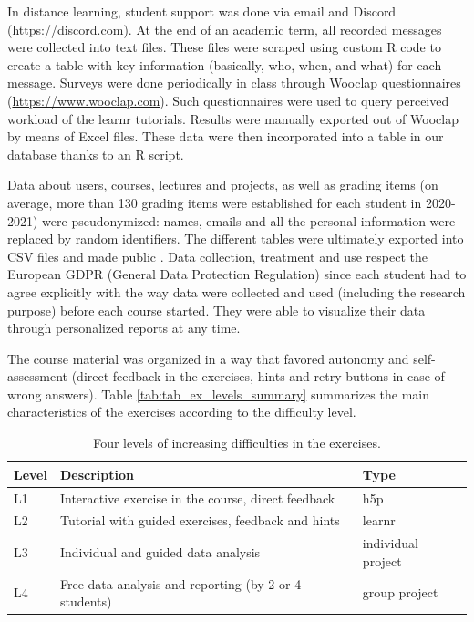 \documentclass{aims} %
\theoremstyle{definition}
\begin{document}
In distance learning, student support was done via email and Discord
(\url{https://discord.com}). At the end of an academic term, all
recorded messages were collected into text files. These files were
scraped using custom R code to create a table with key information
(basically, who, when, and what) for each message. Surveys were done
periodically in class through Wooclap questionnaires
(\url{https://www.wooclap.com}). Such questionnaires were used to query
perceived workload of the learnr tutorials. Results were manually
exported out of Wooclap by means of Excel files. These data were then
incorporated into a table in our database thanks to an R script.

Data about users, courses, lectures and projects, as well as grading
items (on average, more than 130 grading items were established for each
student in 2020-2021) were pseudonymized: names, emails and all the
personal information were replaced by random identifiers. The different
tables were ultimately exported into CSV files and made public
\cite{Grosjeandataset2020}. Data collection, treatment and use respect
the European GDPR (General Data Protection Regulation) since each
student had to agree explicitly with the way data were collected and
used (including the research purpose) before each course started. They
were able to visualize their data through personalized reports at any
time.

The course material was organized in a way that favored autonomy and
self-assessment (direct feedback in the exercises, hints and retry
buttons in case of wrong answers). Table
\ref {tab:tab_ex_levels_summary} summarizes the main characteristics of
the exercises according to the difficulty level.

\begin{table}

\caption{\label{tab:tab_ex_levels_summary}\label{tab:tab_ex_levels} Four levels of increasing difficulties in the exercises.}
\centering
\begin{tabular}[t]{l|l|l}
\hline
Level & Description & Type\\
\hline
L1 & Interactive exercise in the course, direct feedback & h5p\\
\hline
L2 & Tutorial with guided exercises, feedback and hints & learnr\\
\hline
L3 & Individual and guided data analysis & individual project\\
\hline
L4 & Free data analysis and reporting (by 2 or 4 students) & group project\\
\hline
\end{tabular}
\end{table}
\end{document}

